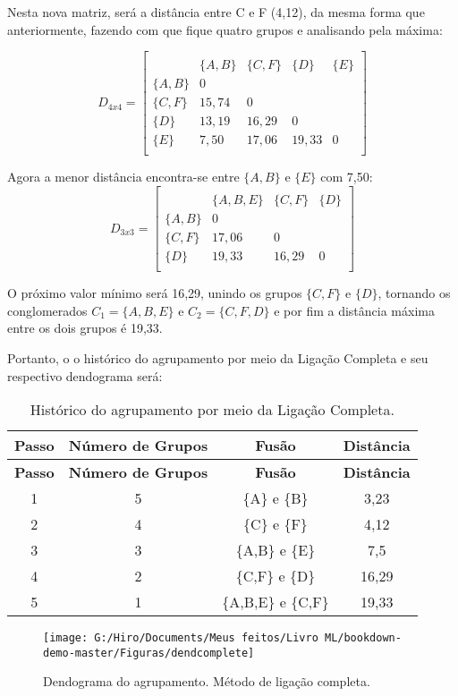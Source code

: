 \documentclass[
]{book}
\begin{document}
Nesta nova matriz, será a distância entre C e F (4,12), da mesma forma que anteriormente, fazendo com que fique quatro grupos e analisando pela máxima:

\[D_{4x4}=\begin{bmatrix}\\
 &\{A,B\}& \{C,F\}&\{D\}&\{E\} \\
 \{A,B\}&0&&\\
 \{C,F\} & 15,74&0&&\\
 \{D\}& 13,19& 16,29&0&\\
 \{E\}& 7,50& 17,06& 19,33&0\\
\end{bmatrix}\]

Agora a menor distância encontra-se entre \(\{A,B\}\) e \(\{E\}\) com 7,50:
\[D_{3x3}=\begin{bmatrix}\\
 &\{A,B,E\}& \{C,F\}&\{D\} \\
 \{A,B\}&0&\\
 \{C,F\} & 17,06&0&\\
 \{D\}& 19,33& 16,29&0\\
\end{bmatrix}\]

O próximo valor mínimo será 16,29, unindo os grupos \(\{C,F\}\) e \(\{D\}\), tornando os conglomerados \(C_1=\{A,B,E\}\) e \(C_2=\{C,F,D\}\) e por fim a distância máxima entre os dois grupos é 19,33.

Portanto, o o histórico do agrupamento por meio da Ligação Completa e seu respectivo dendograma será:

\begin{longtable}[]{@{}cccc@{}}
\caption{\label{tab:ligcomplet} Histórico do agrupamento por meio da Ligação Completa.}\tabularnewline
\toprule
\textbf{Passo} & \textbf{Número de Grupos} & \textbf{Fusão} & \textbf{Distância}\tabularnewline
\midrule
\endfirsthead
\toprule
\textbf{Passo} & \textbf{Número de Grupos} & \textbf{Fusão} & \textbf{Distância}\tabularnewline
\midrule
\endhead
1 & 5 & \{A\} e \{B\} & 3,23\tabularnewline
2 & 4 & \{C\} e \{F\} & 4,12\tabularnewline
3 & 3 & \{A,B\} e \{E\} & 7,5\tabularnewline
4 & 2 & \{C,F\} e \{D\} & 16,29\tabularnewline
5 & 1 & \{A,B,E\} e \{C,F\} & 19,33\tabularnewline
\bottomrule
\end{longtable}

\begin{figure}

{\centering \texttt{[image: G:/Hiro/Documents/Meus feitos/Livro ML/bookdown-demo-master/Figuras/dendcomplete]} 

}

\caption{Dendograma do agrupamento. Método de ligação completa.}\label{fig:dendcomplete}
\end{figure}
\end{document}
